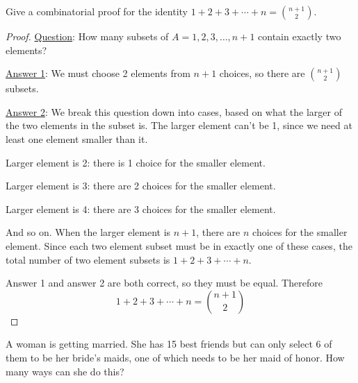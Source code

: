 
\begin{questions}
\question Give a combinatorial proof for the identity $1 + 2 + 3 + \cdots + n = {n+1 \choose 2}$. 
	
	\begin{answer}
	\begin{proof}
        \underline{Question}: How many subsets of $A = {1,2,3, \ldots, n+1}$ contain exactly two elements?
        
        \underline{Answer 1}: We must choose 2 elements from $n+1$ choices, so there are ${n+1 \choose 2}$ subsets.
        
        \underline{Answer 2}: We break this question down into cases, based on what the larger of the two elements in the subset is. The larger element can't be 1, since we need at least one element smaller than it.
        
        Larger element is 2: there is 1 choice for the smaller element.
        
        Larger element is 3: there are 2 choices for the smaller element.
        
        Larger element is 4: there are 3 choices for the smaller element.
        
        And so on.  When the larger element is $n+1$, there are $n$ choices for the smaller element.  Since each two element subset must be in exactly one of these cases, the total number of two element subsets is $1 + 2 + 3 + \cdots + n$.
        
        Answer 1 and answer 2 are both correct, so they must be equal.  Therefore
        \[1 + 2 + 3 + \cdots + n = {n+1 \choose 2}\]
       \end{proof}
	\end{answer}
	
	
	
\question A woman is getting married.  She has 15 best friends but can only select 6 of them to be her bride's maids, one of which needs to be her maid of honor.  How many ways can she do this?
\end{questions}
